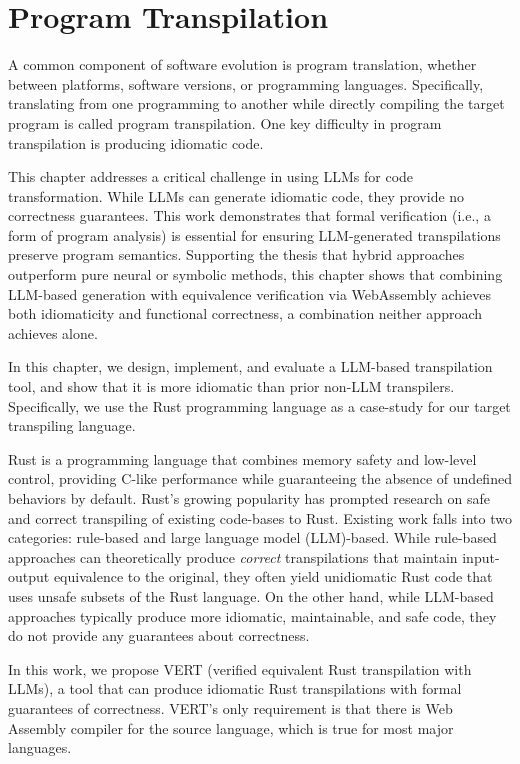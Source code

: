 \documentclass[12pt,openany,oneside,table]{cmuthesis}
\begin{document}
\chapter{Program Transpilation}
\label{ch:vert}
A common component of software evolution is program translation, whether between platforms, software versions, or programming languages. Specifically, translating from one programming to another while directly compiling the target program is called program transpilation.
One key difficulty in program transpilation is producing idiomatic code.

This chapter addresses a critical challenge in using LLMs for code transformation. While LLMs can generate idiomatic code, they provide no correctness guarantees. This work demonstrates that formal verification (i.e., a form of program analysis) is essential for ensuring LLM-generated transpilations preserve program semantics. Supporting the thesis that hybrid approaches outperform pure neural or symbolic methods, this chapter shows that combining LLM-based generation with equivalence verification via WebAssembly achieves both idiomaticity and functional correctness, a combination neither approach achieves alone.

In this chapter, we design, implement, and evaluate a LLM-based transpilation tool, and show that it is more idiomatic than prior non-LLM transpilers. Specifically, we use the Rust programming language as a case-study for our target transpiling language.

Rust is a programming language that combines memory safety and
low-level control, providing C-like performance while guaranteeing the absence of undefined behaviors by default. Rust's growing popularity has prompted research on safe and correct transpiling of existing code-bases to Rust. Existing work falls into two categories: rule-based and large
language model (LLM)-based. While rule-based approaches can
theoretically produce \textit{correct} transpilations that maintain input-output equivalence to the original, they often yield
unidiomatic Rust code that uses unsafe subsets of
the Rust language. On the other hand, while LLM-based approaches typically produce more idiomatic, maintainable, and safe code, they do not provide any guarantees about correctness.

In this work, we propose VERT (verified equivalent Rust transpilation with LLMs), a tool that can produce idiomatic Rust transpilations with formal guarantees of correctness. VERT's only requirement is that there is Web
Assembly compiler for the source language, which is true for most major languages. 
\end{document}
